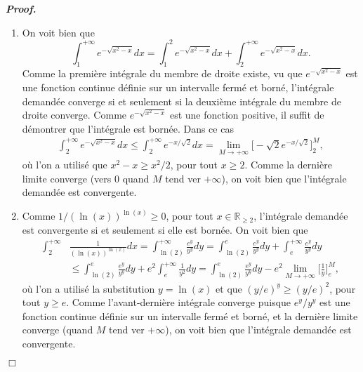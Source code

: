 \documentclass[11pt,a4paper]{article}
\newcommand{\RR}{\mathbb{R}}
\newenvironment{preuve}[1][]
{\vskip 2mm  \noindent\emph{\bf Proof#1. }}{$\Box$ \vskip 2mm}
\let\geq\geqslant
\let\leq\leqslant
\begin{document}
\begin{preuve}
\begin{enumerate}
\begin{enumerate}[label=(\roman*)]
				\item On voit bien que 
				\[     \int_{1}^{+\infty} e^{-\sqrt{x^{2}-x}} dx = \int_{1}^{2} e^{-\sqrt{x^{2}-x}} dx + \int_{2}^{+\infty} e^{-\sqrt{x^{2}-x}} dx.     \]
				Comme la première intégrale du membre de droite existe, vu que $e^{-\sqrt{x^{2}-x}}$ est une fonction continue définie sur un intervalle fermé et borné, l'intégrale demandée converge si et seulement si la deuxième intégrale du membre de droite converge. 
				Comme $e^{-\sqrt{x^{2}-x}}$ est une fonction positive, il suffit de démontrer que l'intégrale est bornée. 
				Dans ce cas 
				\begin{align*}
				\int_{2}^{+\infty} e^{-\sqrt{x^{2}-x}} dx \leq \int_{2}^{+\infty} e^{-x/\sqrt{2}} dx = \underset{M \rightarrow + \infty}{\lim} \bigg[ -\sqrt{2}e^{-x/\sqrt{2}} \bigg]_{2}^{M},     
				\end{align*}
				où l'on a utilisé que $x^{2} - x \geq x^{2}/2$, pour tout $x \geq 2$. 
				Comme la dernière limite converge (vers $0$ quand $M$ tend ver $+ \infty$), on voit bien que l'intégrale demandée est convergente. 
				
				\item Comme $1/(\ln (x))^{\ln (x)} \geq 0$, pour tout $x \in \RR_{\geq 2}$, l'intégrale demandée est convergente si et seulement si elle est bornée. 
				On voit bien que 
				\begin{align*}
				\int_{2}^{+\infty} &\frac{1}{(\ln (x))^{\ln (x)}} dx = \int_{\ln(2)}^{+\infty} \frac{e^{y}}{y^{y}} dy = 
				\int_{\ln(2)}^{e} \frac{e^{y}}{y^{y}} dy +  \int_{e}^{+\infty} \frac{e^{y}}{y^{y}} dy     
				\\
				&\leq \int_{\ln(2)}^{e} \frac{e^{y}}{y^{y}} dy + e^{2} \int_{e}^{+\infty} \frac{1}{y^{2}} dy 
				= \int_{\ln(2)}^{e} \frac{e^{y}}{y^{y}} dy - e^{2} \underset{M \rightarrow + \infty}{\lim} \bigg[ \frac{1}{y} \bigg]_{e}^{M},
				\end{align*}
				où l'on a utilisé la substitution $y = \ln(x)$ et que $(y/e)^{y} \geq (y/e)^{2}$, pour tout $y \geq e$. 
				Comme l'avant-dernière intégrale converge puisque $e^{y}/y^{y}$ est une fonction continue définie sur un intervalle fermé et borné, et la dernière limite converge (quand $M$ tend ver $+ \infty$), on voit bien que l'intégrale demandée est convergente. 
				

\end{enumerate}
\end{enumerate}
\end{preuve}
\end{document}
